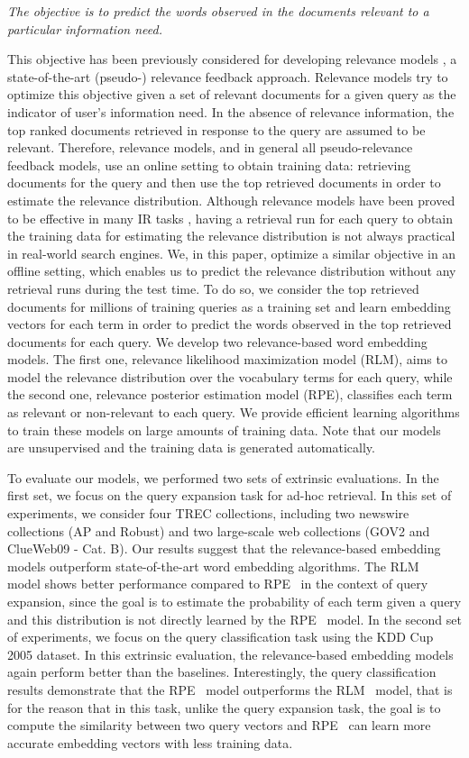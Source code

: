 \documentclass[sigconf]{acmart}
\begin{document}
\smallskip
\textit{The objective is to predict the words observed in the documents relevant to a particular information need.}
\smallskip

This objective has been previously considered for developing relevance models \cite{Lavrenko:2001}, a state-of-the-art (pseudo-) relevance feedback approach. Relevance models try to optimize this objective given a set of relevant documents for a given query as the indicator of user's information need. In the absence of relevance information, the top ranked documents retrieved in response to the query are assumed to be relevant. Therefore, relevance models, and in general all pseudo-relevance feedback models, use an online setting to obtain training data: retrieving documents for the query and then use the top retrieved documents in order to estimate the relevance distribution. Although relevance models have been proved to be effective in many IR tasks \cite{Lavrenko:2001,Lavrenko:2002}, having a retrieval run for each query to obtain the training data for estimating the relevance distribution is not always practical in real-world search engines. We, in this paper, optimize a similar objective in an offline setting, which enables us to predict the relevance distribution without any retrieval runs during the test time. To do so, we consider the top retrieved documents for millions of training queries as a training set and learn embedding vectors for each term in order to predict the words observed in the top retrieved documents for each query. We develop two relevance-based word embedding models. The first one, relevance likelihood maximization model (RLM), aims to model the relevance distribution over the vocabulary terms for each query, while the second one, relevance posterior estimation model (RPE), classifies each term as  relevant or non-relevant to each query. We provide efficient learning algorithms to train these models on large amounts of training data. Note that our models are unsupervised and the training data is generated automatically.

To evaluate our models, we performed two sets of extrinsic evaluations. In the first set, we focus on the query expansion task for ad-hoc retrieval. In this set of experiments, we consider four TREC collections, including two newswire collections (AP and Robust) and two large-scale web collections (GOV2 and ClueWeb09 - Cat. B). Our results suggest that the relevance-based embedding models outperform state-of-the-art word embedding algorithms. The {RLM~} model shows better performance compared to {RPE~} in the context of query expansion, since the goal is to estimate the probability of each term given a query and this distribution is not directly learned by the {RPE~} model. In the second set of experiments, we focus on the query classification task using the KDD Cup 2005 \cite{Li:2005} dataset. In this extrinsic evaluation, the relevance-based embedding models again perform better than the baselines. Interestingly, the query classification results demonstrate that the {RPE~} model outperforms the {RLM~} model, that is for the reason that in this task, unlike the query expansion task, the goal is to compute the similarity between two query vectors and {RPE~} can learn more accurate embedding vectors with less training data.
\end{document}
